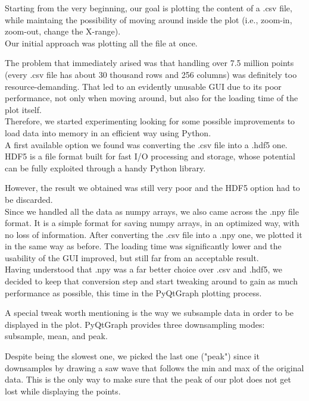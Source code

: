 \documentclass[11pt,a4paper]{article}
\begin{document}
Starting from the very beginning, our goal is plotting the content of a .csv file, while maintaing the possibility of moving around inside the plot (i.e., zoom-in, zoom-out, change the X-range).\\

Our initial approach was plotting all the file at once.

The problem that immediately arised was that handling over 7.5 million points (every .csv file has about 30 thousand rows and 256 columns) was definitely too resource-demanding. That led to an evidently unusable GUI due to its poor performance, not only when moving around, but also for the loading time of the plot itself.\\

Therefore, we started experimenting looking for some possible improvements to load data into memory in an efficient way using Python.\\

A first available option we found was converting the .csv file into a .hdf5 one. HDF5 is a file format built for fast I/O processing and storage, whose potential can be fully exploited through a handy Python library.

However, the result we obtained was still very poor and the HDF5 option had to be discarded.\\

Since we handled all the data as numpy arrays, we also came across the .npy file format. It is a simple format for saving numpy arrays, in an optimized way, with no loss of information.
After converting the .csv file into a .npy one, we plotted it in the same way as before. The loading time was significantly lower and the usability of the GUI improved, but still far from an acceptable result.\\

Having understood that .npy was a far better choice over .csv and .hdf5, we decided to keep that conversion step and start tweaking around to gain as much performance as possible, this time in the PyQtGraph plotting process.

A special tweak worth mentioning is the way we subsample data in order to be displayed in the plot.
PyQtGraph provides three downsampling modes: subsample, mean, and peak.

Despite being the slowest one, we picked the last one ("peak") since it downsamples by drawing a saw wave that follows the min and max of the original data. This is the only way to make sure that the peak of our plot does not get lost while displaying the points.\\
\end{document}
